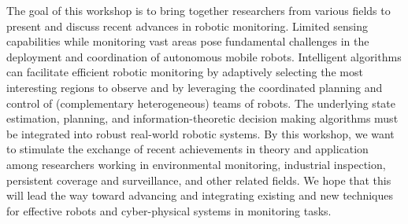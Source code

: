 \begin{spacing}{1.0}
{
The goal of this workshop is to bring together researchers from various fields to present and discuss recent advances in robotic monitoring. Limited sensing capabilities while monitoring vast areas pose fundamental challenges in the deployment and coordination of autonomous mobile robots. Intelligent algorithms can facilitate efficient robotic monitoring by adaptively selecting the most interesting regions to observe and by leveraging the coordinated planning and control of (complementary heterogeneous) teams of robots. The underlying state estimation, planning, and information-theoretic decision making algorithms must be integrated into robust real-world robotic systems. By this workshop, we want to stimulate the exchange of recent achievements in theory and application among researchers working in environmental monitoring, industrial inspection, persistent coverage and surveillance, and other related fields. We hope that this will lead the way toward advancing and integrating existing and new techniques for effective robots and cyber-physical systems in monitoring tasks.


}

\clearpage


\end{spacing}
